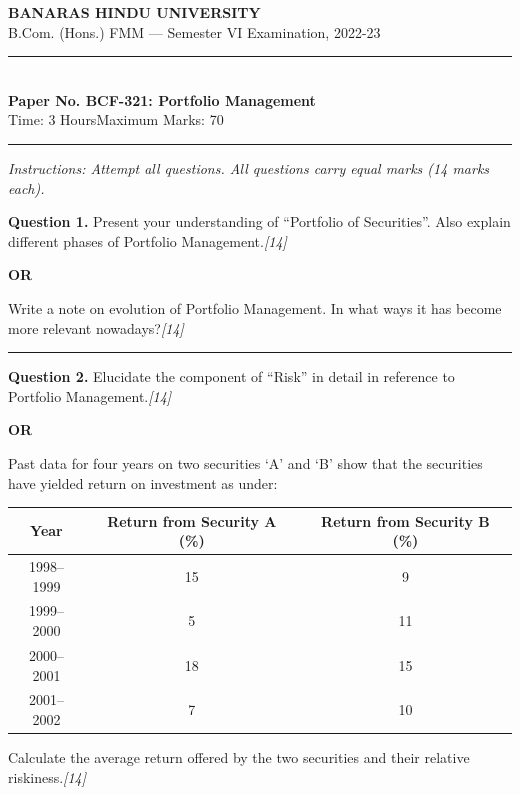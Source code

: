 \documentclass[11pt,a4paper]{article}
\newcommand{\pts}[1]{\hfill   \textit{[#1]}}
\begin{document}
\begin{center}
  {\large\bfseries BANARAS HINDU UNIVERSITY}\\[2pt]
  {\normalsize B.Com. (Hons.) FMM --- Semester VI Examination, 2022-23}\\[6pt]
  \rule{0.8\linewidth}{0.5pt}\\[6pt]
  {\large\bfseries Paper No. BCF-321: Portfolio Management}\\[4pt]
  {\normalsize Time: 3 Hours\hfill Maximum Marks: 70}
\end{center}

\rule{\linewidth}{0.4pt}

\smallskip



\noindent   \textit{Instructions: Attempt all questions. All questions carry equal marks (14 marks each).}

\bigskip




\noindent   \textbf{Question 1.}
Present your understanding of ``Portfolio of Securities''. Also explain different phases of Portfolio Management.\pts{14}

\centerline{   \textbf{OR}}

Write a note on evolution of Portfolio Management. In what ways it has become more relevant nowadays?\pts{14}

\medskip\rule{\linewidth}{0.2pt}




\noindent   \textbf{Question 2.}
Elucidate the component of ``Risk'' in detail in reference to Portfolio Management.\pts{14}

\centerline{   \textbf{OR}}

Past data for four years on two securities `A' and `B' show that the securities have yielded return on investment as under:

\begin{center}

\begin{tabular}{|c|c|c|}
\hline
   \textbf{Year} &   \textbf{Return from Security A (\%)} &   \textbf{Return from Security B (\%)} \\ \hline
1998--1999 & 15 & 9 \\ \hline
1999--2000 & 5 & 11 \\ \hline
2000--2001 & 18 & 15 \\ \hline
2001--2002 & 7 & 10 \\ \hline
\end{tabular}
\end{center}
Calculate the average return offered by the two securities and their relative riskiness.\pts{14}
\end{document}
